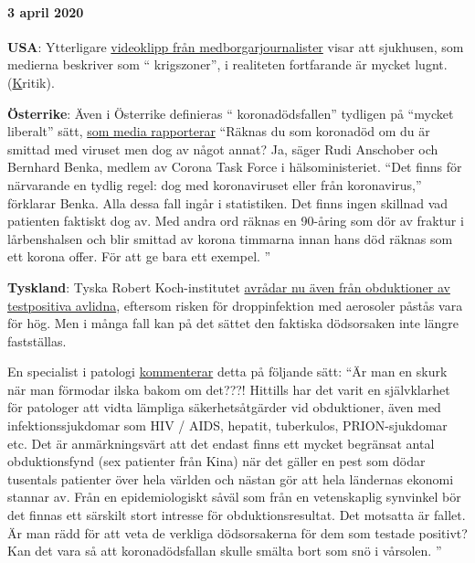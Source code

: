 \hypertarget{3-april-2020}{%
\paragraph{3 april 2020}\label{3-april-2020}}

\textbf{USA}: Ytterligare
\href{https://www.youtube.com/watch?v=5pIMD1enwd4}{videoklipp från
medborgarjournalister} visar att sjukhusen, som medierna beskriver som
`` krigszoner'', i realiteten fortfarande är mycket lugnt.
(\href{https://www.politifact.com/factchecks/2020/apr/03/facebook-posts/hospital-beds-being-kept-empty-prepare-covid-influ/}{K}ritik).

\textbf{Österrike}: Även i Österrike definieras `` koronadödsfallen''
tydligen på ``mycket liberalt'' sätt,
\href{https://www.heute.at/s/osterreich-bei-corona-todesstatistik-sehr-liberal-48665863}{som
media rapporterar} ``Räknas du som koronadöd om du är smittad med
viruset men dog av något annat? Ja, säger Rudi Anschober och Bernhard
Benka, medlem av Corona Task Force i hälsoministeriet. ``Det finns för
närvarande en tydlig regel: dog med koronaviruset eller från
koronavirus,'' förklarar Benka. Alla dessa fall ingår i statistiken. Det
finns ingen skillnad vad patienten faktiskt dog av. Med andra ord räknas
en 90-åring som dör av fraktur i lårbenshalsen och blir smittad av
korona timmarna innan hans död räknas som ett korona offer. För att ge
bara ett exempel. ''

\textbf{Tyskland}: Tyska Robert Koch-institutet
\href{https://www.youtube.com/watch?v=gSn_YaOYYcY}{avrådar nu även från
obduktioner av testpositiva avlidna}, eftersom risken för droppinfektion
med aerosoler påstås vara för hög. Men i många fall kan på det sättet
den faktiska dödsorsaken inte längre fastställas.

En specialist i patologi
\href{https://www.youtube.com/watch?v=gSn_YaOYYcY}{kommenterar} detta på
följande sätt: ``Är man en skurk när man förmodar ilska bakom om det???!
Hittills har det varit en självklarhet för patologer att vidta lämpliga
säkerhetsåtgärder vid obduktioner, även med infektionssjukdomar som HIV
/ AIDS, hepatit, tuberkulos, PRION-sjukdomar etc. Det är anmärkningsvärt
att det endast finns ett mycket begränsat antal obduktionsfynd (sex
patienter från Kina) när det gäller en pest som dödar tusentals
patienter över hela världen och nästan gör att hela ländernas ekonomi
stannar av. Från en epidemiologiskt såväl som från en vetenskaplig
synvinkel bör det finnas ett särskilt stort intresse för
obduktionsresultat. Det motsatta är fallet. Är man rädd för att veta de
verkliga dödsorsakerna för dem som testade positivt? Kan det vara så att
koronadödsfallan skulle smälta bort som snö i vårsolen. ''

